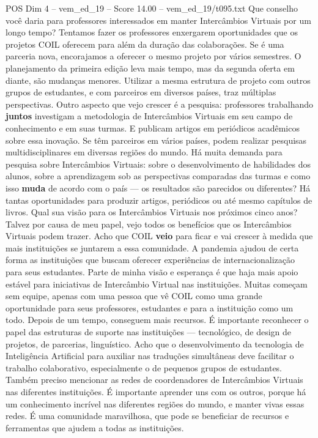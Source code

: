 \begin{textsample}{POS Dim 4 – vem\_ed\_19 – Score 14.00 – vem\_ed\_19/t095.txt}
Que conselho você daria para professores interessados em manter Intercâmbios Virtuais por um longo tempo?
Tentamos fazer os professores enxergarem oportunidades que os projetos COIL oferecem para além da duração das colaborações.
Se é uma parceria nova, encorajamos a oferecer o mesmo projeto por vários semestres.
O planejamento da primeira edição leva mais tempo, mas da segunda oferta em diante, são mudanças menores.
Utilizar a mesma estrutura de projeto com outros grupos de estudantes, e com parceiros em diversos países, traz múltiplas perspectivas.
Outro aspecto que vejo crescer é a pesquisa: professores trabalhando \textbf{juntos} investigam a metodologia de Intercâmbios Virtuais em seu campo de conhecimento e em suas turmas.
E publicam artigos em periódicos acadêmicos sobre essa inovação.
Se têm parceiros em vários países, podem realizar pesquisas multidisciplinares em diversas regiões do mundo.
Há muita demanda para pesquisa sobre Intercâmbios Virtuais: sobre o desenvolvimento de habilidades dos alunos, sobre a aprendizagem sob as perspectivas comparadas das turmas e como isso \textbf{muda} de acordo com o país — os resultados são parecidos ou diferentes?
Há tantas oportunidades para produzir artigos, periódicos ou até mesmo capítulos de livros.
Qual sua visão para os Intercâmbios Virtuais nos próximos cinco anos?
Talvez por causa de meu papel, vejo todos os benefícios que os Intercâmbios Virtuais podem trazer.
Acho que COIL \textbf{veio} para ficar e vai crescer à medida que mais instituições se juntarem a essa comunidade.
A pandemia ajudou de certa forma as instituições que buscam oferecer experiências de internacionalização para seus estudantes.
Parte de minha visão e esperança é que haja mais apoio estável para iniciativas de Intercâmbio Virtual nas instituições.
Muitas começam sem equipe, apenas com uma pessoa que vê COIL como uma grande oportunidade para seus professores, estudantes e para a instituição como um todo.
Depois de um tempo, conseguem mais recursos.
É importante reconhecer o papel das estruturas de suporte nas instituições — tecnológico, de design de projetos, de parcerias, linguístico.
Acho que o desenvolvimento da tecnologia de Inteligência Artificial para auxiliar nas traduções simultâneas deve facilitar o trabalho colaborativo, especialmente o de pequenos grupos de estudantes.
Também preciso mencionar as redes de coordenadores de Intercâmbios Virtuais nas diferentes instituições.
É importante aprender uns com os outros, porque há um conhecimento incrível nas diferentes regiões do mundo, e manter vivas essas redes.
É uma comunidade maravilhosa, que pode se beneficiar de recursos e ferramentas que ajudem a todas as instituições.

\end{textsample}
